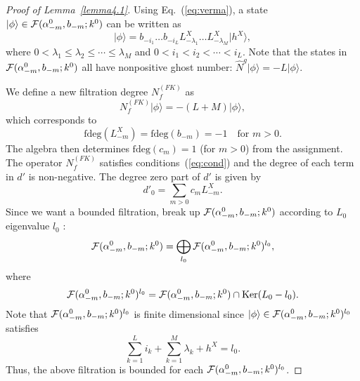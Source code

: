 \documentclass[a4paper,12pt]{article}
\newcommand{\ket}[1]{\mbox{$| #1 \rangle$}}
\newcommand{\eq}[1]{(\ref{eq:#1})}
\newcommand{\cond}[1]{\quad\mbox{#1}}
\newcommand{\hN}{\hat{N}^g}
\begin{document}
\begin{proof}[Proof of Lemma~\ref{lemma4.1}]
{}Using Eq.~\eq{verma},
a state $\ket{\phi} \in
{\cal F}(\alpha^{0}_{-m}, b_{-m};k^0)$ can be written as
\begin{equation}
%
\ket{\phi} = b_{-i_{1}} \ldots b_{-i_{L}}
                L^{X}_{-\lambda_{1}} \ldots L^{X}_{-\lambda_{M}}
\ket{h^{X}},
\label{eq:statebn}
%
\end{equation}
where $ 0 < \lambda_{1} \leq \lambda_{2} \leq \cdots \leq \lambda_{M} $ and
$ 0 < i_{1} < i_{2} < \cdots < i_{L} $.
Note that the states in ${\cal F}(\alpha^{0}_{-m}, b_{-m};k^0)$
all have nonpositive ghost number: $\hN \ket{\phi} = -L \ket{\phi}$.

We define a new filtration degree $N^{(FK)}_{f}$ as
\begin{equation}
%
N^{(FK)}_{f} \ket{\phi} = -(L+M) \ket{\phi},
%
\end{equation}
which corresponds to
\begin{equation}
%
\mbox{fdeg}(L^{X}_{-m}) = \mbox{fdeg}(b_{-m}) = -1
\cond{for $m>0$.}
%
\end{equation}
The algebra then determines $ \mbox{fdeg}(c_{m}) = 1 $ (for $m>0$)
from the assignment.
The operator $N^{(FK)}_{f}$ satisfies conditions~\eq{cond}
and the degree of each term in $d'$ is non-negative.
The degree zero part of $d'$ is given by
\begin{equation}
%
d'_{0} = \sum_{m>0} c_{m} L^{X}_{-m}.
%
\end{equation}
Since we want a bounded filtration, break up 
${\cal F}(\alpha^{0}_{-m}, b_{-m};k^0)$
according to $L_0$ eigenvalue $l_0$ :
\begin{equation}
%
{\cal F}(\alpha^{0}_{-m}, b_{-m};k^0) 
= \bigoplus_{l_0} {\cal F}(\alpha^{0}_{-m}, b_{-m};k^0)^{l_0},
%
\end{equation}
where
\begin{equation}
{\cal F}(\alpha^{0}_{-m}, b_{-m};k^0)^{l_0}
 = {\cal F}(\alpha^{0}_{-m}, b_{-m};k^0)
             \cap\mbox{Ker}(L_0-l_0).
\end{equation}
Note that ${\cal F}(\alpha^{0}_{-m}, b_{-m};k^0)^{l_0}$ is finite dimensional
since $ \ket{\phi} \in {\cal F}(\alpha^{0}_{-m}, b_{-m};k^0)^{l_0}$
satisfies
\begin{equation}
%
\sum^L_{k=1}i_k + \sum^M_{k=1}\lambda_k + h^{X} =l_0 .
%
\end{equation}
Thus, the above filtration
 is bounded for each ${\cal F}(\alpha^{0}_{-m}, b_{-m};k^0)^{l_0}$.


\end{proof}
\end{document}
